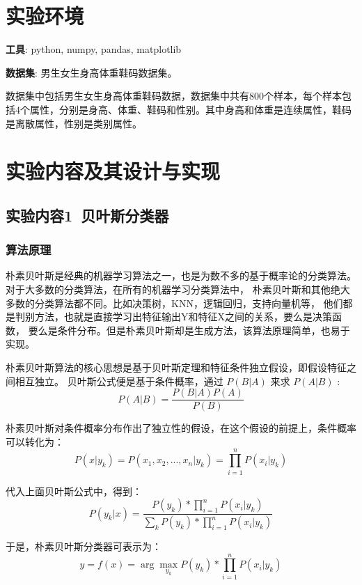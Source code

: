 \documentclass[lang=cn,a4paper]{shu-lab-report}
\begin{document}
\section{实验环境}
\textbf{工具}: python, numpy, pandas, matplotlib

\textbf{数据集}: 
男生女生身高体重鞋码数据集。

数据集中包括男生女生身高体重鞋码数据，数据集中共有800个样本，每个样本包括4个属性，分别是身高、体重、鞋码和性别。其中身高和体重是连续属性，鞋码是离散属性，性别是类别属性。


\section{实验内容及其设计与实现}

\subsection{实验内容1~贝叶斯分类器}
\subsubsection{算法原理}
朴素贝叶斯是经典的机器学习算法之一，也是为数不多的基于概率论的分类算法。
对于大多数的分类算法，在所有的机器学习分类算法中，
朴素贝叶斯和其他绝大多数的分类算法都不同。比如决策树，KNN，逻辑回归，支持向量机等，
他们都是判别方法，也就是直接学习出特征输出Y和特征X之间的关系，要么是决策函数，
要么是条件分布。但是朴素贝叶斯却是生成方法，该算法原理简单，也易于实现。

朴素贝叶斯算法的核心思想是基于贝叶斯定理和特征条件独立假设，即假设特征之间相互独立。
贝叶斯公式便是基于条件概率，通过 $P(B|A)$ 来求 $P(A|B)$ :
\begin{equation}
    P(A|B) = \frac{P(B|A)P(A)}{P(B)}
\end{equation}

朴素贝叶斯对条件概率分布作出了独立性的假设，在这个假设的前提上，条件概率可以转化为：
\begin{equation}
    P(x|y_k)=P(x_1,x_2,...,x_n|y_k)=\prod_{i=1}^{n}{P(x_i|y_k)}
\end{equation}

代入上面贝叶斯公式中，得到：
\begin{equation}
    P(y_k|x)=\frac{P(y_k)\ast\prod_{i=1}^{n}{P(x_i|y_k)}}{\sum_{k}{P(y_k)}\ast\prod_{i=1}^{n}{P(x_i|y_k)}}
\end{equation}

于是，朴素贝叶斯分类器可表示为：
\begin{equation}
    y=f(x)=\arg\max_{y_k}{P(y_k)\ast\prod_{i=1}^{n}{P(x_i|y_k)}}
\end{equation}
\end{document}
